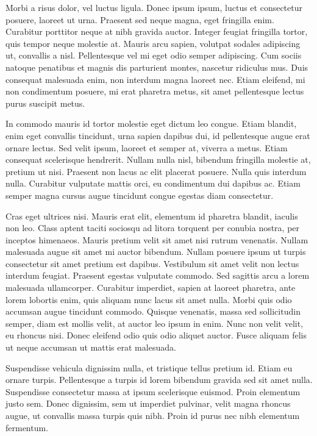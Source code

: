 \documentclass[a4paper]{article}
\begin{document}
Morbi a risus dolor, vel luctus ligula. Donec ipsum ipsum, luctus et consectetur posuere, laoreet ut urna. Praesent sed neque magna, eget fringilla enim. Curabitur porttitor neque at nibh gravida auctor. Integer feugiat fringilla tortor, quis tempor neque molestie at. Mauris arcu sapien, volutpat sodales adipiscing ut, convallis a nisl. Pellentesque vel mi eget odio semper adipiscing. Cum sociis natoque penatibus et magnis dis parturient montes, nascetur ridiculus mus. Duis consequat malesuada enim, non interdum magna laoreet nec. Etiam eleifend, mi non condimentum posuere, mi erat pharetra metus, sit amet pellentesque lectus purus suscipit metus.

In commodo mauris id tortor molestie eget dictum leo congue. Etiam blandit, enim eget convallis tincidunt, urna sapien dapibus dui, id pellentesque augue erat ornare lectus. Sed velit ipsum, laoreet et semper at, viverra a metus. Etiam consequat scelerisque hendrerit. Nullam nulla nisl, bibendum fringilla molestie at, pretium ut nisi. Praesent non lacus ac elit placerat posuere. Nulla quis interdum nulla. Curabitur vulputate mattis orci, eu condimentum dui dapibus ac. Etiam semper magna cursus augue tincidunt congue egestas diam consectetur.

Cras eget ultrices nisi. Mauris erat elit, elementum id pharetra blandit, iaculis non leo. Class aptent taciti sociosqu ad litora torquent per conubia nostra, per inceptos himenaeos. Mauris pretium velit sit amet nisi rutrum venenatis. Nullam malesuada augue sit amet mi auctor bibendum. Nullam posuere ipsum ut turpis consectetur sit amet pretium est dapibus. Vestibulum sit amet velit non lectus interdum feugiat. Praesent egestas vulputate commodo. Sed sagittis arcu a lorem malesuada ullamcorper. Curabitur imperdiet, sapien at laoreet pharetra, ante lorem lobortis enim, quis aliquam nunc lacus sit amet nulla. Morbi quis odio accumsan augue tincidunt commodo. Quisque venenatis, massa sed sollicitudin semper, diam est mollis velit, at auctor leo ipsum in enim. Nunc non velit velit, eu rhoncus nisi. Donec eleifend odio quis odio aliquet auctor. Fusce aliquam felis ut neque accumsan ut mattis erat malesuada.

Suspendisse vehicula dignissim nulla, et tristique tellus pretium id. Etiam eu ornare turpis. Pellentesque a turpis id lorem bibendum gravida sed sit amet nulla. Suspendisse consectetur massa at ipsum scelerisque euismod. Proin elementum justo sem. Donec dignissim, sem ut imperdiet pulvinar, velit magna rhoncus augue, ut convallis massa turpis quis nibh. Proin id purus nec nibh elementum fermentum.
\end{document}
